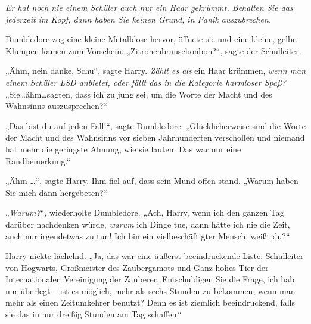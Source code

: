 \emph{Er hat noch nie einem Schüler auch nur ein Haar gekrümmt. Behalten Sie das jederzeit im Kopf, dann haben Sie keinen Grund, in Panik auszubrechen.}

Dumbledore zog eine kleine Metalldose hervor, öffnete sie und eine kleine, gelbe Klumpen kamen zum Vorschein. „Zitronenbrausebonbon?“, sagte der Schulleiter.

„Ähm, nein danke, Schu“, sagte Harry. \emph{Zählt es als} ein Haar krümmen, \emph{wenn man einem Schüler LSD anbietet, oder fällt das in die Kategorie harmloser Spaß?} „Sie…ähm…sagten, dass ich zu jung sei, um die Worte der Macht und des Wahnsinns auszusprechen?“

„Das bist du auf jeden Fall!“, sagte Dumbledore. „Glücklicherweise sind die Worte der Macht und des Wahnsinns vor sieben Jahrhunderten verschollen und niemand hat mehr die geringste Ahnung, wie sie lauten. Das war nur eine Randbemerkung.“

„Ähm …“, sagte Harry. Ihm fiel auf, dass sein Mund offen stand. „Warum haben Sie mich dann hergebeten?“

„\emph{Warum?}“, wiederholte Dumbledore. „Ach, Harry, wenn ich den ganzen Tag darüber nachdenken würde, \emph{warum} ich Dinge tue, dann hätte ich nie die Zeit, auch nur irgendetwas zu tun! Ich bin ein vielbeschäftigter Mensch, weißt du?“

Harry nickte lächelnd. „Ja, das war eine äußerst beeindruckende Liste. Schulleiter von Hogwarts, Großmeister des Zaubergamots und Ganz hohes Tier der Internationalen Vereinigung der Zauberer. Entschuldigen Sie die Frage, ich hab nur überlegt – ist es möglich, mehr als sechs Stunden zu bekommen, wenn man mehr als einen Zeitumkehrer benutzt? Denn es ist ziemlich beeindruckend, falls sie das in nur dreißig Stunden am Tag schaffen.“

